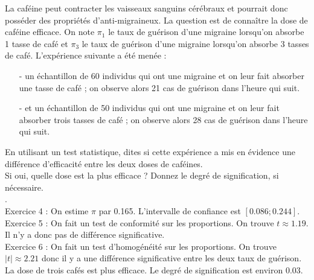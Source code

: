 \documentclass{article}
\numberwithin{equation}{section}
\begin{document}
\noindent La caféine peut contracter les vaisseaux sanguins cérébraux  et pourrait donc posséder des propriétés 
d'anti-migraineux. La question est de connaître la dose de caféine efficace. On note $\pi_1$ le taux
de guérison d'une migraine lorsqu'on absorbe 1 tasse de café et $\pi_3$ le taux
de guérison d'une migraine lorsqu'on absorbe 3 tasses de café. L'expérience suivante a été menée : 
\begin{itemize}
\item[-] un échantillon de 60 individus qui ont une migraine et on leur fait absorber une tasse de café ; on observe alors 21 cas de guérison dans l'heure qui suit.
\item[-] et un échantillon de 50 individus qui ont une migraine et on leur fait absorber trois tasses de café ; on observe alors 28 cas de guérison dans l'heure qui suit. 
\end{itemize} 
En utilisant un test statistique, dites si cette expérience a mis en évidence une différence d'efficacité 
entre les deux doses de caféines. \\
Si oui, quelle dose est la plus efficace ? Donnez le degré de signification, si nécessaire. \\

\bigskip 
\bigskip 
\bigskip 
{}.\\

\noindent Exercice 4 : 
On estime $\pi$ par 0.165. L'intervalle de confiance est $[0.086 ; 0.244]$.\\

\noindent Exercice 5 : On fait un test de conformité sur les proportions. 
On trouve $t\approx 1.19$. Il n'y a donc pas de différence significative.\\


\noindent Exercice 6 : On fait un test d'homogénéité sur les proportions.
On trouve $|t|\approx 2.21$ donc il y a une différence significative entre les deux taux de guérison.
La dose de trois cafés est plus efficace. Le degré de signification est environ 0.03.
\end{document}
